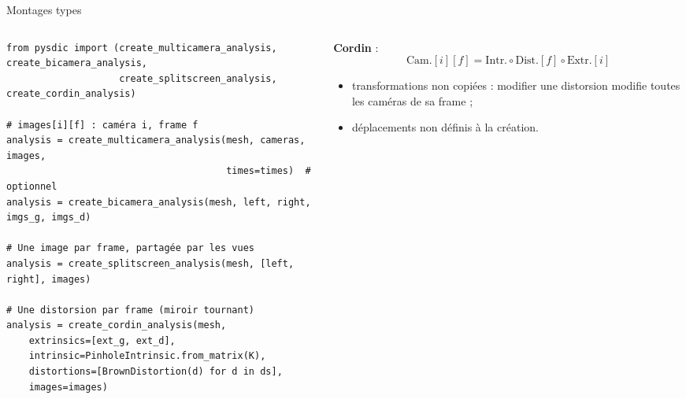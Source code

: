 \documentclass[aspectratio=169,11pt]{beamer}
\begin{document}
\begin{frame}[fragile]{Montages types}
  \begin{columns}[T]
    \begin{column}{0.53\textwidth}
\begin{lstlisting}[basicstyle=\ttfamily\tiny]
from pysdic import (create_multicamera_analysis, create_bicamera_analysis,
                    create_splitscreen_analysis, create_cordin_analysis)
 
# images[i][f] : caméra i, frame f
analysis = create_multicamera_analysis(mesh, cameras, images,
                                       times=times)  # optionnel
analysis = create_bicamera_analysis(mesh, left, right, imgs_g, imgs_d)
 
# Une image par frame, partagée par les vues
analysis = create_splitscreen_analysis(mesh, [left, right], images)
 
# Une distorsion par frame (miroir tournant)
analysis = create_cordin_analysis(mesh,
    extrinsics=[ext_g, ext_d],
    intrinsic=PinholeIntrinsic.from_matrix(K),
    distortions=[BrownDistortion(d) for d in ds],
    images=images)
\end{lstlisting}
    \end{column}
    \begin{column}{0.45\textwidth}\footnotesize
      \textbf{Cordin} :
      \[
        \text{Cam.}[i][f] = \text{Intr.} \circ \text{Dist.}[f] \circ \text{Extr.}[i]
      \]
      \begin{itemize}
        \item transformations \alert{non copiées} : modifier une distorsion
              modifie toutes les caméras de sa frame ;
        \item déplacements non définis à la création.
      \end{itemize}
    \end{column}
  \end{columns}
\end{frame}
\end{document}
